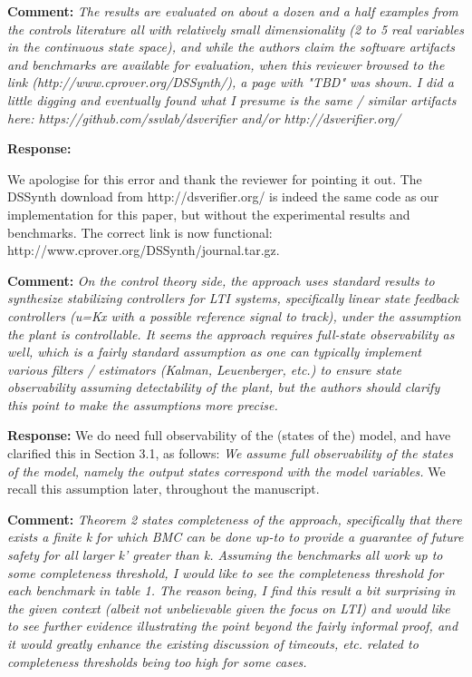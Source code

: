\documentclass{article}
\begin{document}
\vspace{2em}
{\bf Comment: } {\itshape The results are evaluated on about a dozen and a half examples from the controls literature all with relatively small
dimensionality (2 to 5 real variables in the continuous state space), and while the authors claim the software artifacts and benchmarks are available
for evaluation, when this reviewer browsed to the link (http://www.cprover.org/DSSynth/), a page with "TBD" was shown. I did a little digging and
eventually found what I presume is the same / similar artifacts here: https://github.com/ssvlab/dsverifier and/or http://dsverifier.org/}

\vspace{1em}
{\bf Response: }

We apologise for this error and thank the reviewer for pointing it out. The DSSynth download from http://dsverifier.org/ is indeed the same code 
as our implementation for this paper, but without the experimental results and benchmarks. The correct link is now functional: http://www.cprover.org/DSSynth/journal.tar.gz.

\vspace{2em}
{\bf Comment: } {\itshape On the control theory side, the approach uses standard results to synthesize stabilizing controllers for LTI systems,
specifically linear state feedback controllers (u=Kx with a possible reference signal to track), under the assumption the plant is controllable. It
seems the approach requires full-state observability as well, which is a fairly standard assumption as one can typically implement various filters /
estimators (Kalman, Leuenberger, etc.) to ensure state observability assuming detectability of the plant, but the authors should clarify this point to
make the assumptions more precise.}

\vspace{1em}
{\bf Response: }
We do need full observability of the (states of the) model, and have clarified this in Section 3.1, as follows: {\it We assume full observability of
the states of the model, namely the output states correspond with the model variables.  } We recall this assumption later, throughout the manuscript. 

\vspace{2em}
{\bf Comment: } {\itshape Theorem 2 states completeness of the approach, specifically that there exists a finite k for which BMC can be done up-to to
provide a guarantee of future safety for all larger k' greater than k. Assuming the benchmarks all work up to some completeness threshold, I would
like to see
the completeness threshold for each benchmark in table 1. The reason being, I find this result a bit surprising in the given context (albeit not
unbelievable given the focus on LTI) and would like to see further evidence illustrating the point beyond the fairly informal proof, and it would
greatly enhance the existing discussion of timeouts, etc. related to completeness thresholds being too high for some cases.}
\end{document}
